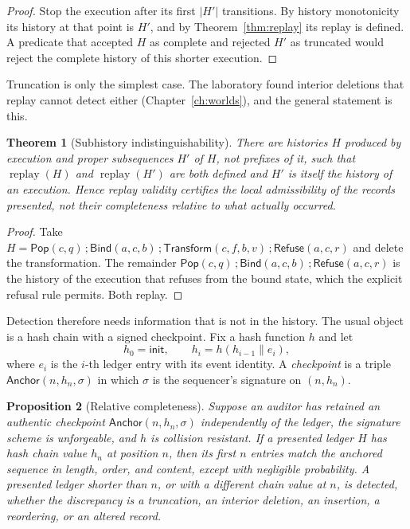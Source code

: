 \documentclass[11pt,openany]{book}
\newtheorem{theorem}{Theorem}[chapter]
\newtheorem{proposition}[theorem]{Proposition}
\theoremstyle{remark}
\newcommand{\Pop}{\mathsf{Pop}}
\newcommand{\Refuse}{\mathsf{Refuse}}
\newcommand{\Bind}{\mathsf{Bind}}
\newcommand{\Transform}{\mathsf{Transform}}
\newcommand{\replay}{\operatorname{replay}}
\begin{document}
\begin{proof}
Stop the execution after its first $|H'|$ transitions. By history
monotonicity its history at that point is $H'$, and by
Theorem~\ref{thm:replay} its replay is defined. A predicate that accepted
$H$ as complete and rejected $H'$ as truncated would reject the complete
history of this shorter execution.
\end{proof}

Truncation is only the simplest case. The laboratory found interior
deletions that replay cannot detect either (Chapter~\ref{ch:worlds}), and
the general statement is this.

\begin{theorem}[Subhistory indistinguishability]\label{thm:subhistory}
There are histories $H$ produced by execution and proper subsequences
$H'$ of $H$, not prefixes of it, such that $\replay(H)$ and $\replay(H')$
are both defined and $H'$ is itself the history of an execution. Hence
replay validity certifies the local admissibility of the records
presented, not their completeness relative to what actually occurred.
\end{theorem}

\begin{proof}
Take $H=\Pop(c,q)\,;\Bind(a,c,b)\,;\Transform(c,f,b,v)\,;\Refuse(a,c,r)$
and delete the transformation. The remainder
$\Pop(c,q)\,;\Bind(a,c,b)\,;\Refuse(a,c,r)$ is the history of the
execution that refuses from the bound state, which the explicit refusal
rule permits. Both replay.
\end{proof}

Detection therefore needs information that is not in the history. The
usual object is a hash chain with a signed checkpoint. Fix a hash function
$h$ and let
\[
h_0=\mathsf{init},\qquad h_i=h(h_{i-1}\parallel e_i),
\]
where $e_i$ is the $i$-th ledger entry with its event identity. A
\emph{checkpoint} is a triple $\mathsf{Anchor}(n,h_n,\sigma)$ in which
$\sigma$ is the sequencer's signature on $(n,h_n)$.

\begin{proposition}[Relative completeness]\label{prop:anchor}
Suppose an auditor has retained an authentic checkpoint
$\mathsf{Anchor}(n,h_n,\sigma)$ independently of the ledger, the
signature scheme is unforgeable, and $h$ is collision resistant. If a
presented ledger $H$ has hash chain value $h_n$ at position $n$, then its
first $n$ entries match the anchored sequence in length, order, and
content, except with negligible probability. A presented ledger shorter
than $n$, or with a different chain value at $n$, is detected, whether
the discrepancy is a truncation, an interior deletion, an insertion, a
reordering, or an altered record.
\end{proposition}
\end{document}
